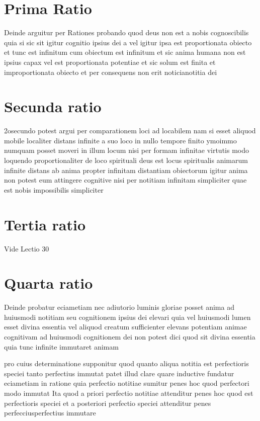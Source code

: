 \documentclass[twoside, openright]{report}
\begin{document}
        \bigskip
         \section*{Prima Ratio} 
        \pstart
        Deinde arguitur per Rationes probando quod deus non est a nobis cognoscibilis quia si sic sit igitur cognitio ipsius dei a vel igitur ipsa est proportionata obiecto et tunc est infinitum cum obiectum est infinitum et sic anima humana non est ipsius capax vel est proportionata potentiae et sic solum est finita et improportionata obiecto et per consequens non erit noticianotitia dei
        \pend
      
        \bigskip
         \section*{Secunda ratio} 
        \pstart
        2osecundo potest argui per comparationem loci ad locabilem nam si esset aliquod mobile localiter distans infinite a suo loco in nullo tempore finito ymoimmo numquam posset moveri in illum locum nisi per formam infinitae virtutis modo loquendo proportionaliter de loco spirituali deus est locus spiritualis animarum infinite distans ab anima propter infinitam distantiam obiectorum igitur anima non potest eum attingere cognitive nisi per notitiam infinitam simpliciter quae est nobis impossibilis simpliciter
        \pend
      
        \bigskip
         \section*{Tertia ratio} 
        \pstart
        Vide Lectio 30
        \pend
      
        \bigskip
         \section*{Quarta ratio} 
        \pstart
        Deinde probatur eciametiam nec adiutorio luminis gloriae posset anima ad huiusmodi notitiam seu cognitionem ipsius dei elevari quia vel huiusmodi lumen esset divina essentia vel aliquod creatum sufficienter elevans potentiam animae cognitivam ad huiusmodi cognitionem dei non potest dici quod sit divina essentia quia tunc infinite immutaret animam
        \pend
     
        \pstart
        pro cuius determinatione supponitur quod quanto aliqua notitia est perfectioris speciei tanto perfectius immutat patet illud clare quare inductive fundatur eciametiam in ratione quia perfectio notitiae sumitur penes hoc quod perfectori modo immutat Ita quod a priori perfectio notitiae attenditur penes hoc quod est perfectioris speciei et a posteriori perfectio speciei attenditur penes perfecciusperfectius immutare
        \pend
     
\end{document}
